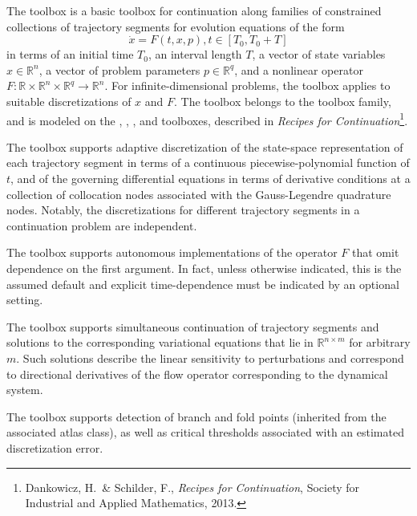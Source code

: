 The  toolbox is a basic toolbox for continuation along families of constrained collections of trajectory segments for evolution equations of the form
\begin{equation}
\dot{x}=F(t,x,p), t\in[T_0,T_0+T]
\end{equation}
in terms of an initial time $T_0$, an interval length $T$, a vector of state variables $x\in\mathbb{R}^n$, a vector of problem parameters $p\in\mathbb{R}^q$, and a nonlinear operator $F:\mathbb{R}\times\mathbb{R}^n\times\mathbb{R}^q\rightarrow\mathbb{R}^n$. For infinite-dimensional problems, the toolbox applies to suitable discretizations of $x$ and $F$. The  toolbox belongs to the  toolbox family, and is modeled on the , , , and  toolboxes, described in \emph{Recipes for Continuation}\footnote{Dankowicz, H.~\& Schilder, F., \emph{Recipes for Continuation}, Society for Industrial and Applied Mathematics, 2013.}.

The  toolbox supports adaptive discretization of the state-space representation of each trajectory segment in terms of a continuous piecewise-polynomial function of $t$, and of the governing differential equations in terms of derivative conditions at a collection of collocation nodes associated with the Gauss-Legendre quadrature nodes. Notably, the discretizations for different trajectory segments in a continuation problem are independent.

The  toolbox supports autonomous implementations of the operator $F$ that omit dependence on the first argument. In fact, unless otherwise indicated, this is the assumed default and explicit time-dependence must be indicated by an optional setting.

The  toolbox supports simultaneous continuation of trajectory segments and solutions to the corresponding variational equations that lie in $\mathbb{R}^{n\times m}$ for arbitrary $m$. Such solutions describe the linear sensitivity to perturbations and correspond to directional derivatives of the flow operator corresponding to the dynamical system.

The  toolbox supports detection of branch and fold points (inherited from the associated atlas class), as well as critical thresholds associated with an estimated discretization error.


